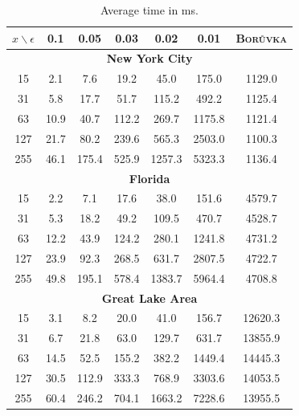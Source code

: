 \begin{table}[ht!]
  \centering
  \begin{tabular}{|c|c|c|c|c|c|c|}
    \hline
    $x \backslash \epsilon$ & 0.1 & 0.05 & 0.03 & 0.02 & 0.01 & \textsc{Bor\r{u}vka} \\ \hline
    \multicolumn{7}{|c|}{\textbf{New York City}} \\ \hline
    15 & 2.1 & 7.6 & 19.2 & 45.0 & 175.0 & 1129.0 \\ \hline
    31 & 5.8 & 17.7 & 51.7 & 115.2 & 492.2 & 1125.4 \\ \hline
    63 & 10.9 & 40.7 & 112.2 & 269.7 & 1175.8 & 1121.4 \\ \hline
    127 & 21.7 & 80.2 & 239.6 & 565.3 & 2503.0 & 1100.3 \\ \hline
    255 & 46.1 & 175.4 & 525.9 & 1257.3 & 5323.3 & 1136.4 \\ \hline
    \multicolumn{7}{|c|}{\textbf{Florida}} \\ \hline
    15 & 2.2 & 7.1 & 17.6 & 38.0 & 151.6 & 4579.7 \\ \hline
    31 & 5.3 & 18.2 & 49.2 & 109.5 & 470.7 & 4528.7 \\ \hline
    63 & 12.2 & 43.9 & 124.2 & 280.1 & 1241.8 & 4731.2 \\ \hline
    127 & 23.9 & 92.3 & 268.5 & 631.7 & 2807.5 & 4722.7 \\ \hline
    255 & 49.8 & 195.1 & 578.4 & 1383.7 & 5964.4 & 4708.8 \\ \hline
    \multicolumn{7}{|c|}{\textbf{Great Lake Area}} \\ \hline
    15 & 3.1 & 8.2 & 20.0 & 41.0 & 156.7 & 12620.3 \\ \hline
    31 & 6.7 & 21.8 & 63.0 & 129.7 & 631.7 & 13855.9 \\ \hline
    63 & 14.5 & 52.5 & 155.2 & 382.2 & 1449.4 & 14445.3 \\ \hline
    127 & 30.5 & 112.9 & 333.3 & 768.9 & 3303.6 & 14053.5 \\ \hline
    255 & 60.4 & 246.2 & 704.1 & 1663.2 & 7228.6 & 13955.5 \\ \hline
  \end{tabular}
  \caption{Average time in ms.}
\end{table}

